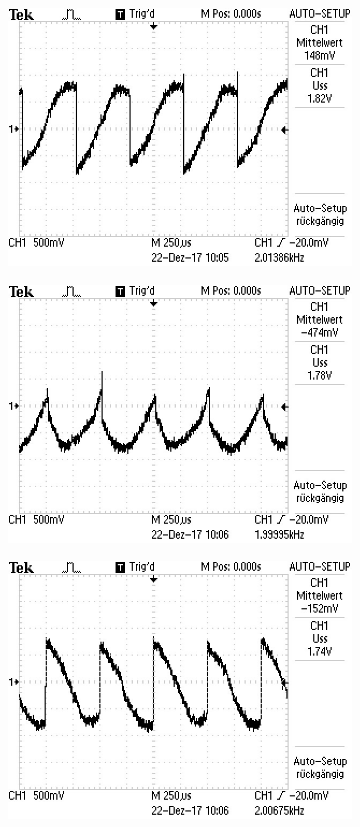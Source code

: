 \begin{figure}[H]
\begin{subfigure}{0.48\textwidth}
	\includegraphics[width=\textwidth]{90GradR.JPG}
\end{subfigure}
\begin{subfigure}{0.48\textwidth}
  \includegraphics[width=\textwidth]{180GradR.JPG}
\end{subfigure}
\begin{subfigure}{0.48\textwidth}
	\includegraphics[width=\textwidth]{270GradR.JPG}

\end{subfigure}
\end{figure}
